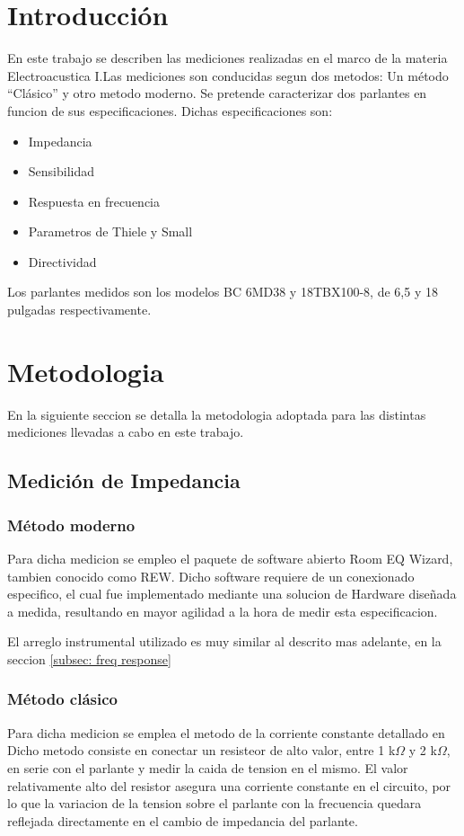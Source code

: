 \documentclass[]{article}
\begin{document}
\begin{multicols}{2}
\section{Introducción}
En este trabajo se describen las mediciones realizadas en el marco de la materia
Electroacustica I.Las mediciones son conducidas segun dos metodos: Un método ``Clásico'' y otro metodo
moderno. Se pretende caracterizar dos parlantes en funcion de sus especificaciones.
Dichas especificaciones son:
\begin{itemize}
  \item Impedancia
  \item Sensibilidad
  \item Respuesta en frecuencia
  \item Parametros de Thiele y Small
  \item{Directividad}
\end{itemize}

Los parlantes medidos son los modelos BC 6MD38 y 18TBX100-8, de 6,5 y 18
pulgadas respectivamente.
\section{Metodologia}
En la siguiente seccion se detalla la metodologia adoptada para las distintas
mediciones llevadas a cabo en este trabajo.

\subsection{Medición de Impedancia}

\subsubsection{Método moderno}
\label{subsec: z moderno}
Para dicha medicion se empleo el paquete de software abierto Room EQ Wizard, tambien
conocido como REW. Dicho software requiere de un conexionado especifico, el cual
fue implementado mediante una solucion de Hardware diseñada a medida, resultando
en mayor agilidad a la hora de medir esta especificacion.

El arreglo instrumental utilizado es muy similar al descrito mas adelante,
en la seccion \ref{subsec: freq response}

\subsubsection{Método clásico}
Para dicha medicion se emplea el metodo de la corriente constante detallado en \cite{Ruffa}
Dicho metodo consiste en conectar un resisteor de alto valor, entre 1 k$\Omega$ y
2 k$\Omega$, en serie con el parlante y medir la caida de tension en el mismo.
El valor relativamente alto del resistor asegura una corriente constante en el
circuito, por lo que la variacion de la tension sobre el parlante con la frecuencia
quedara reflejada directamente en el cambio de impedancia del parlante.


\end{multicols}
\end{document}
